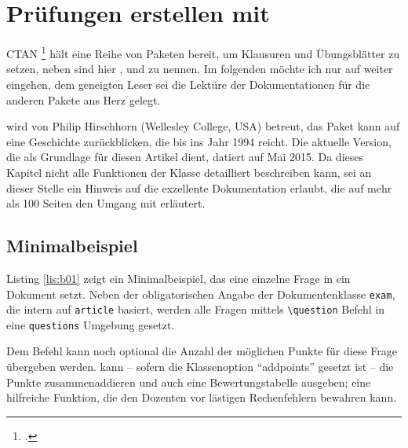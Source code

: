 \chapter[Prüfungen erstellen mit exam]{Prüfungen erstellen mit }


CTAN%
\footcite[Vgl.][]{ziegenhagen:dtk2016/2} 
hält eine Reihe von Paketen bereit, um Klausuren und Übungsblätter zu setzen, neben  sind hier ,  und  zu nennen. 
Im folgenden möchte ich nur auf  weiter eingehen, dem geneigten Leser sei die Lektüre der Dokumentationen für die anderen Pakete ans Herz gelegt.

 wird von Philip Hirschhorn (Wellesley College, USA) betreut, das Paket kann auf eine Geschichte zurückblicken, die bis ins Jahr 1994 reicht. 
Die aktuelle Version, die als Grundlage für diesen Artikel dient, datiert auf Mai 2015. 
Da dieses Kapitel nicht alle Funktionen der Klasse detailliert beschreiben kann, sei an dieser Stelle ein Hinweis auf die exzellente Dokumentation erlaubt, die auf mehr als 100 Seiten den Umgang mit  erläutert.

\section{Minimalbeispiel}

Listing \ref{lis:b01} zeigt ein Minimalbeispiel, das eine einzelne Frage in ein Dokument setzt. 
Neben der obligatorischen Angabe der Dokumentenklasse \texttt{exam}, die intern auf \texttt{article} basiert, werden alle Fragen mittels \texttt{\textbackslash question} Befehl in eine \texttt{questions} Umgebung gesetzt. 


Dem   Befehl kann noch optional die Anzahl der möglichen Punkte für diese Frage übergeben werden. 
 kann -- sofern die Klassenoption \enquote{addpoints} gesetzt ist -- die Punkte zusammenaddieren und auch eine Bewertungstabelle ausgeben; eine hilfreiche Funktion, die den Dozenten vor lästigen Rechenfehlern bewahren kann.


